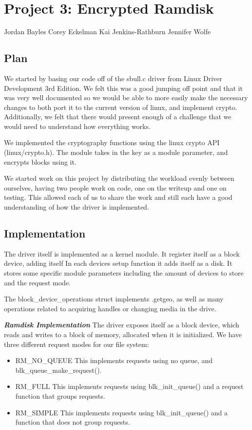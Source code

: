 \section{Project 3: Encrypted Ramdisk}

Jordan Bayles Corey Eckelman Kai Jenkins-Rathburn Jennifer Wolfe

\subsection{Plan}

We started by basing our code off of the sbull.c driver from Linux
Driver Development 3rd Edition. We felt this was a good jumping off
point and that it was very well documented so we would be able to more
easily make the necessary changes to both port it to the current version
of linux, and implement crypto. Additionally, we felt that there would
present enough of a challenge that we would need to understand how
everything works.

We implemented the cryptography functions using the linux crypto API
(linux/crypto.h). The module takes in the key as a module parameter, and
encrypts blocks using it.

We started work on this project by distributing the workload evenly
between ourselves, having two people work on code, one on the writeup
and one on testing. This allowed each of us to share the work and still
each have a good understanding of how the driver is implemented.

\subsection{Implementation}

The driver itself is implemented as a kernel module. It register itself
as a block device, adding itself In each devices setup function it adds
itself as a disk. It stores some specific module parameters including
the amount of devices to store and the request mode.

The block\_device\_operations struct implements .getgeo, as well as many
operations related to acquiring handles or changing media in the drive.

\textbf{\emph{Ramdisk Implementation}} The driver exposes itself as a
block device, which reads and writes to a block of memory, allocated
when it is initialized. We have three different request modes for our
file system: 
\begin{itemize}
\item{RM\_NO\_QUEUE} This implements requests using no queue,
and blk\_queue\_make\_request().  
\item{RM\_FULL} This implements requests
using blk\_init\_queue() and a request function that groups requests. 
\item{RM\_SIMPLE} This implements requests using blk\_init\_queue() and a
function that does not group requests.
\end{itemize}

